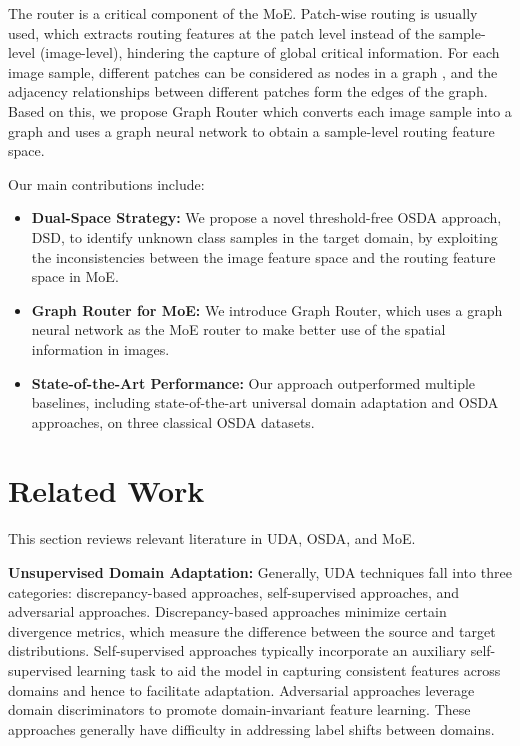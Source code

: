 \documentclass[10pt,twocolumn,letterpaper]{article}
\begin{document}
The router is a critical component of the MoE. Patch-wise routing \cite{riquelme2021scaling,fedus2022review, li2023sparse} is usually used, which extracts routing features at the patch level instead of the sample-level (image-level), hindering the capture of global critical information. For each image sample, different patches can be considered as nodes in a graph \cite{han2022vision}, and the adjacency relationships between different patches form the edges of the graph. Based on this, we propose Graph Router which converts each image sample into a graph and uses a graph neural network \cite{kipf2017semisupervised, veli2018graph} to obtain a sample-level routing feature space.

Our main contributions include:
\begin{itemize}
    \item \textbf{Dual-Space Strategy:} We propose a novel threshold-free OSDA approach, DSD, to identify unknown class samples in the target domain, by exploiting the inconsistencies between the image feature space and the routing feature space in MoE.
    \item \textbf{Graph Router for MoE:} We introduce Graph Router, which uses a graph neural network as the MoE router to make better use of the spatial information in images.
    \item \textbf{State-of-the-Art Performance:} Our approach outperformed multiple baselines, including state-of-the-art universal domain adaptation and OSDA approaches, on three classical OSDA datasets.
\end{itemize}

\section{Related Work} \label{sec:formatting}

This section reviews relevant literature in UDA, OSDA, and MoE.

\textbf{Unsupervised Domain Adaptation:} Generally, UDA techniques fall into three categories: discrepancy-based approaches, self-supervised approaches, and adversarial approaches. Discrepancy-based approaches \cite{long2015learning, sun2017correlation, lee2019sliced} minimize certain divergence metrics, which measure the difference between the source and target distributions. Self-supervised approaches \cite{ghifary2016deep, feng2019self, yue2021prototypical} typically incorporate an auxiliary self-supervised learning task to aid the model in capturing consistent features across domains and hence to facilitate adaptation. Adversarial approaches \cite{ganin2015unsupervised, long2018conditional, saito2019strong} leverage domain discriminators to promote domain-invariant feature learning. These approaches generally have difficulty in addressing label shifts between domains.
\end{document}
